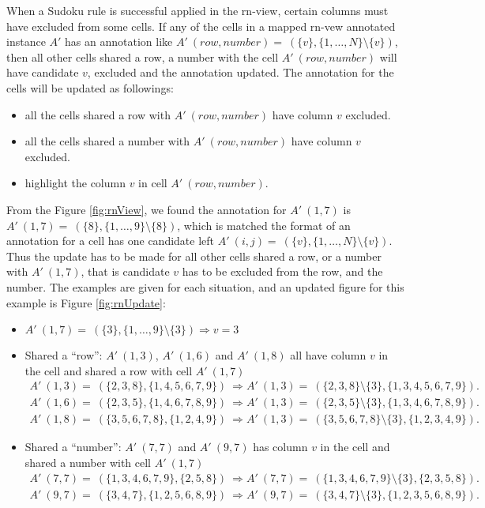 \documentclass[11pt]{report}
\newcommand{\set}[1]{\{ #1 \}}
\begin{document}
When a Sudoku rule is successful applied in the rn-view, certain columns must have excluded from some cells. If any of the cells in a mapped rn-vew annotated instance $A'$ has an annotation like $A'\ (row, number) =\ (\set{v}, \set{1,\dots,N} \setminus \set{v})$, then all other cells shared a row, a number with the cell $A'\ (row, number)$ will have candidate $v$, excluded and the annotation updated. The annotation for the cells will be updated as followings:
\begin{itemize}
\item all the cells shared a row with $A'\ (row, number)$ have column $v$ excluded.
\item all the cells shared a number with $A'\ (row, number)$ have column $v$ excluded.
\item highlight the column $v$ in cell $A'\ (row, number)$.
\end{itemize} 

From the Figure \ref{fig:rnView}, we found the annotation for $A'\ (1,7)$ is $A'\ (1,7) =\ (\set{8}, \set{1, \dots, 9} \setminus \set{8})$, which is matched the format of an annotation for a cell has one candidate left $A'\ (i,j) =\ (\set{v}, \set{1,\dots,N} \setminus \set{v})$. Thus the update has to be made for all other cells shared a row, or a number with $A'\ (1,7)$, that is candidate $v$ has to be excluded from the row, and the number. The examples are given for each situation, and an updated figure for this example is Figure \ref{fig:rnUpdate}:
\begin{itemize}
\item $A'\ (1,7) =\ (\set{3}, \set{1, \dots, 9} \setminus \set{3}) \Rightarrow v = 3$
\item Shared a ``row'': $A'\ (1,3)$, $A'\ (1,6)$ and $A'\ (1,8)$ all have column $v$ in the cell and shared a row with cell $A'\ (1,7)$
\begin{eqnarray*}
A'\ (1,3) =\ (\set{2, 3, 8}, \set{1, 4, 5, 6, 7, 9})\ \Rightarrow A'\ (1,3) =\ (\set{2, 3, 8}\setminus \set{3}, \set{1, 3, 4, 5, 6, 7, 9}).\\
A'\ (1,6) =\ (\set{2, 3, 5}, \set{1, 4, 6, 7, 8, 9})\ \Rightarrow A'\ (1,3) =\ (\set{2, 3, 5}\setminus \set{3}, \set{1, 3, 4, 6, 7, 8, 9}).\\
A'\ (1,8) =\ (\set{3, 5, 6, 7, 8}, \set{1, 2, 4, 9})\ \Rightarrow A'\ (1,3) =\ (\set{3, 5, 6, 7, 8}\setminus \set{3}, \set{1, 2, 3, 4, 9}).
\end{eqnarray*}
\item Shared a ``number'': $A'\ (7,7)$ and $A'\ (9,7)$ has column $v$ in the cell and shared a number with cell $A'\ (1,7)$
\begin{eqnarray*}
A'\ (7,7) =\ (\set{1, 3, 4, 6, 7, 9}, \set{2, 5, 8})\ \Rightarrow A'\ (7,7) =\ (\set{1, 3, 4, 6, 7, 9}\setminus \set{3}, \set{2, 3, 5, 8}).\\
A'\ (9,7) =\ (\set{3, 4, 7}, \set{1, 2, 5, 6, 8, 9})\ \Rightarrow A'\ (9,7) =\ (\set{3, 4, 7}\setminus \set{3}, \set{1, 2, 3, 5, 6, 8, 9}).
\end{eqnarray*}
\end{itemize}
\end{document}
